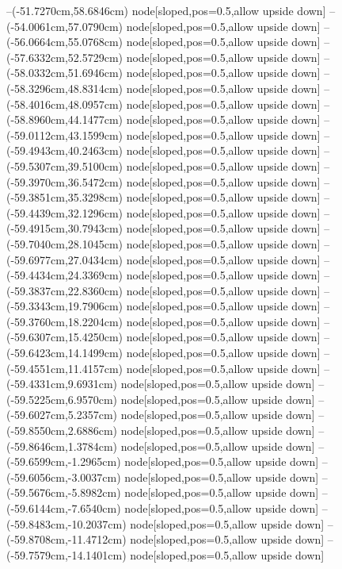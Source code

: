 --(-51.7270cm,58.6846cm) node[sloped,pos=0.5,allow upside down]{\ArrowIn}
--(-54.0061cm,57.0790cm) node[sloped,pos=0.5,allow upside down]{\ArrowIn}
--(-56.0664cm,55.0768cm) node[sloped,pos=0.5,allow upside down]{\ArrowIn}
--(-57.6332cm,52.5729cm) node[sloped,pos=0.5,allow upside down]{\ArrowIn}
--(-58.0332cm,51.6946cm) node[sloped,pos=0.5,allow upside down]{\arrowIn}
--(-58.3296cm,48.8314cm) node[sloped,pos=0.5,allow upside down]{\ArrowIn}
--(-58.4016cm,48.0957cm) node[sloped,pos=0.5,allow upside down]{\arrowIn}
--(-58.8960cm,44.1477cm) node[sloped,pos=0.5,allow upside down]{\ArrowIn}
--(-59.0112cm,43.1599cm) node[sloped,pos=0.5,allow upside down]{\arrowIn}
--(-59.4943cm,40.2463cm) node[sloped,pos=0.5,allow upside down]{\ArrowIn}
--(-59.5307cm,39.5100cm) node[sloped,pos=0.5,allow upside down]{\arrowIn}
--(-59.3970cm,36.5472cm) node[sloped,pos=0.5,allow upside down]{\ArrowIn}
--(-59.3851cm,35.3298cm) node[sloped,pos=0.5,allow upside down]{\ArrowIn}
--(-59.4439cm,32.1296cm) node[sloped,pos=0.5,allow upside down]{\ArrowIn}
--(-59.4915cm,30.7943cm) node[sloped,pos=0.5,allow upside down]{\ArrowIn}
--(-59.7040cm,28.1045cm) node[sloped,pos=0.5,allow upside down]{\ArrowIn}
--(-59.6977cm,27.0434cm) node[sloped,pos=0.5,allow upside down]{\ArrowIn}
--(-59.4434cm,24.3369cm) node[sloped,pos=0.5,allow upside down]{\ArrowIn}
--(-59.3837cm,22.8360cm) node[sloped,pos=0.5,allow upside down]{\ArrowIn}
--(-59.3343cm,19.7906cm) node[sloped,pos=0.5,allow upside down]{\ArrowIn}
--(-59.3760cm,18.2204cm) node[sloped,pos=0.5,allow upside down]{\ArrowIn}
--(-59.6307cm,15.4250cm) node[sloped,pos=0.5,allow upside down]{\ArrowIn}
--(-59.6423cm,14.1499cm) node[sloped,pos=0.5,allow upside down]{\ArrowIn}
--(-59.4551cm,11.4157cm) node[sloped,pos=0.5,allow upside down]{\ArrowIn}
--(-59.4331cm,9.6931cm) node[sloped,pos=0.5,allow upside down]{\ArrowIn}
--(-59.5225cm,6.9570cm) node[sloped,pos=0.5,allow upside down]{\ArrowIn}
--(-59.6027cm,5.2357cm) node[sloped,pos=0.5,allow upside down]{\ArrowIn}
--(-59.8550cm,2.6886cm) node[sloped,pos=0.5,allow upside down]{\ArrowIn}
--(-59.8646cm,1.3784cm) node[sloped,pos=0.5,allow upside down]{\ArrowIn}
--(-59.6599cm,-1.2965cm) node[sloped,pos=0.5,allow upside down]{\ArrowIn}
--(-59.6056cm,-3.0037cm) node[sloped,pos=0.5,allow upside down]{\ArrowIn}
--(-59.5676cm,-5.8982cm) node[sloped,pos=0.5,allow upside down]{\ArrowIn}
--(-59.6144cm,-7.6540cm) node[sloped,pos=0.5,allow upside down]{\ArrowIn}
--(-59.8483cm,-10.2037cm) node[sloped,pos=0.5,allow upside down]{\ArrowIn}
--(-59.8708cm,-11.4712cm) node[sloped,pos=0.5,allow upside down]{\ArrowIn}
--(-59.7579cm,-14.1401cm) node[sloped,pos=0.5,allow upside down]{\ArrowIn}
